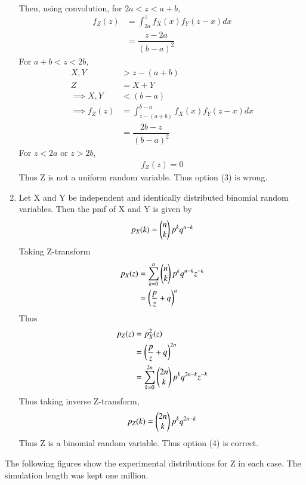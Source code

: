 \documentclass[journal,12pt,twocolumn]{IEEEtran}
\begin{document}
\begin{enumerate}[label = \arabic*)]
\begin{align}
    \end{align}
    Then, using convolution, for $2a<z<a+b$, 
    \begin{align}
        f_Z(z) &= \int_{2a}^z f_X(x)f_Y(z-x) dx\\
               &= \dfrac{z-2a}{(b-a)^2}
    \end{align}
    For $a+b<z<2b$,
    \begin{align}
        X,Y &> z - (a+b)\\
        Z &= X+Y\\
        \implies X,Y &< (b-a)\\
        \implies f_Z(z) &= \int_{z-(a+b)}^{b-a} f_X(x)f_Y(z-x)dx\\
                        &= \dfrac{2b-z}{(b-a)^2}
    \end{align}
    For $z<2a$ or $z>2b$, 
    \begin{align}
        f_Z(z) = 0
    \end{align}
    Thus Z is not a uniform random variable. Thus option (3) is wrong.
    \item Let X and Y be independent and identically distributed binomial random variables. Then the pmf of X and Y is given by
    \begin{align}
        p_X(k) = \begin{pmatrix}n\\k\end{pmatrix}p^k q^{n-k}
    \end{align}
    Taking Z-transform
    \begin{align}
        p_X(z) &= \sum_{k=0}^n \begin{pmatrix}n\\k\end{pmatrix} p^k q^{n-k} z^{-k}\\
               &= \left(\dfrac{p}{z}+q \right)^n
    \end{align}
    Thus
    \begin{align}
        p_Z(z) &= p_X^2(z)\\
               &= \left(\dfrac{p}{z}+q \right)^{2n}\\
               &= \sum_{k=0}^{2n} \begin{pmatrix}2n\\k\end{pmatrix} p^k q^{2n-k} z^{-k}
    \end{align}
    Thus taking inverse Z-transform, 
    \begin{align}
        p_Z(k) = \begin{pmatrix}2n\\k\end{pmatrix} p^k q^{2n-k}
    \end{align}
    Thus Z is a binomial random variable. Thus option (4) is correct.
\end{enumerate}
The following figures show the experimental distributions for Z in each case. The simulation length was kept one million.
\end{document}
